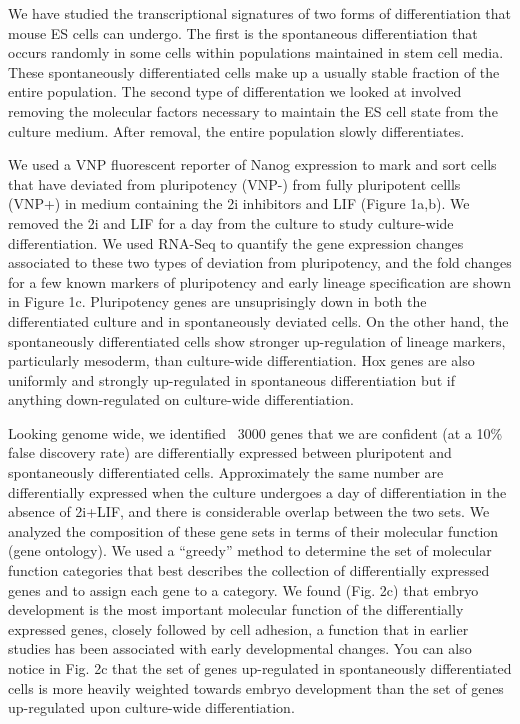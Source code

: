 
We have studied the transcriptional signatures of two forms of differentiation that mouse ES cells can undergo. The first is the spontaneous differentiation that occurs randomly in some cells within populations maintained in stem cell media. These spontaneously differentiated cells make up a usually stable fraction of the entire population. The second type of differentation we looked at involved removing the molecular factors necessary to maintain the ES cell state from the culture medium. After removal, the entire population slowly differentiates.

We used a VNP fluorescent reporter of Nanog expression to mark and sort cells that have deviated from pluripotency (VNP-) from fully pluripotent cellls (VNP+) in medium containing the 2i inhibitors and LIF (Figure 1a,b). We removed the 2i and LIF for a day from the culture to study culture-wide differentiation. We used RNA-Seq to quantify the gene expression changes associated to these two types of deviation from pluripotency, and the fold changes for a few known markers of pluripotency and early lineage specification are shown in Figure 1c. Pluripotency genes are unsuprisingly down in both the differentiated culture and in spontaneously deviated cells. On the other hand, the spontaneously differentiated cells show stronger up-regulation of lineage markers, particularly mesoderm, than culture-wide differentiation. Hox genes are also uniformly and strongly up-regulated in spontaneous differentiation but if anything down-regulated on culture-wide differentiation.

Looking genome wide, we identified ~3000 genes that we are confident (at a 10\% false discovery rate) are differentially expressed between pluripotent and spontaneously differentiated cells. Approximately the same number are differentially expressed when the culture undergoes a day of differentiation in the absence of 2i+LIF, and there is considerable overlap between the two sets. We analyzed the composition of these gene sets in terms of their molecular function (gene ontology). We used a ``greedy'' method to determine the set of molecular function categories that best describes the collection of differentially expressed genes and to assign each gene to a category. We found (Fig. 2c) that embryo development is the most important molecular function of the differentially expressed genes, closely followed by cell adhesion, a function that in earlier studies has been associated with early developmental changes. You can also notice in Fig. 2c that the set of genes up-regulated in spontaneously differentiated cells is more heavily weighted towards embryo development than the set of genes up-regulated upon culture-wide differentiation. 

